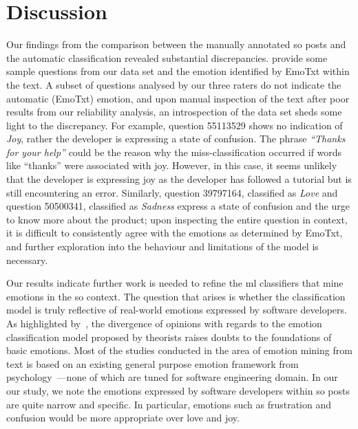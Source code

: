 \section{Discussion}\label{semotion2020:sec:discussion}

Our findings from the comparison between the manually annotated \gls{so} posts and the automatic classification revealed substantial discrepancies.  provide some sample questions from our data set and the emotion identified by EmoTxt within the text. A subset of questions analysed by our three raters do not indicate the automatic (EmoTxt) emotion, and upon manual inspection of the text after poor results from our reliability analysis, an introspection of the data set sheds some light to the discrepancy. For example, question 55113529 shows no indication of \textit{Joy}, rather the developer is expressing a state of confusion. The phrase \textit{``Thanks for your help''} could be the reason why the miss-classification occurred if words like ``thanks'' were associated with joy. However, in this case, it seems unlikely that the developer is expressing joy as the developer has followed a tutorial but is still encountering an error. Similarly, question 39797164, classified as \textit{Love} and question 50500341, classified as \textit{Sadness} express a state of confusion and the urge to know more about the product; upon inspecting the entire question in context, it is difficult to consistently agree with the emotions as determined by EmoTxt, and further exploration into the behaviour and limitations of the model is necessary.

Our results indicate further work is needed to refine the \gls{ml} classifiers that mine emotions in the \gls{so} context. The question that arises is whether the classification model is truly reflective of real-world emotions expressed by software developers. As highlighted by~\citet{curumsing2017}, the divergence of opinions with regards to the emotion classification model proposed by theorists raises doubts to the foundations of basic emotions. Most of the studies conducted in the area of emotion mining from text is based on an existing general purpose emotion framework from psychology~\citep{Ondrej:2016, ortu2016, novielli2018}---none of which are tuned for software engineering domain. In our our study, we note the emotions expressed by software developers within \gls{so} posts are quite narrow and specific. In particular, emotions such as frustration and confusion would be more appropriate over love and joy. 


